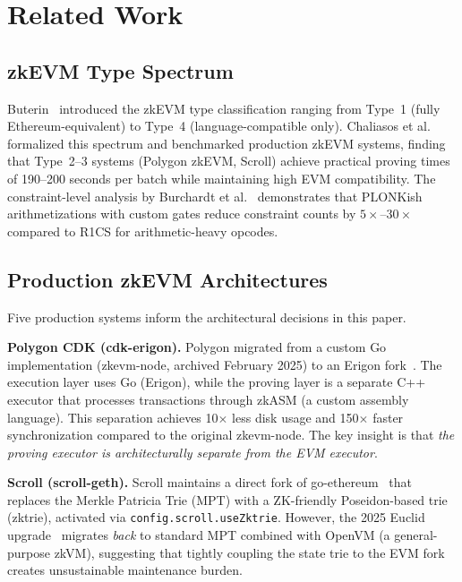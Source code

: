 
\section{Related Work}

\subsection{zkEVM Type Spectrum}

Buterin~\cite{buterin2022zkevm} introduced the zkEVM type classification
ranging from Type~1 (fully Ethereum-equivalent) to Type~4 (language-compatible
only). Chaliasos et al.~\cite{chaliasos2024analyzing} formalized this spectrum
and benchmarked production zkEVM systems, finding that Type~2--3 systems
(Polygon zkEVM, Scroll) achieve practical proving times of 190--200 seconds
per batch while maintaining high EVM compatibility. The constraint-level
analysis by Burchardt et al.~\cite{burchardt2025constraint} demonstrates that
PLONKish arithmetizations with custom gates reduce constraint counts by
$5\times$--$30\times$ compared to R1CS for arithmetic-heavy opcodes.

\subsection{Production zkEVM Architectures}

Five production systems inform the architectural decisions in this paper.

\textbf{Polygon CDK (cdk-erigon).} Polygon migrated from a custom Go
implementation (zkevm-node, archived February 2025) to an Erigon
fork~\cite{polygon2024cdk}. The execution layer uses Go (Erigon), while the
proving layer is a separate C++ executor that processes transactions through
zkASM (a custom assembly language). This separation achieves 10$\times$ less
disk usage and 150$\times$ faster synchronization compared to the original
zkevm-node. The key insight is that \emph{the proving executor is architecturally
separate from the EVM executor}.

\textbf{Scroll (scroll-geth).} Scroll maintains a direct fork of
go-ethereum~\cite{scroll2024whitepaper} that replaces the Merkle Patricia Trie
(MPT) with a ZK-friendly Poseidon-based trie (zktrie), activated via
\texttt{config.scroll.useZktrie}. However, the 2025 Euclid
upgrade~\cite{scroll2025euclid} migrates \emph{back} to standard MPT combined
with OpenVM (a general-purpose zkVM), suggesting that tightly coupling the
state trie to the EVM fork creates unsustainable maintenance burden.

